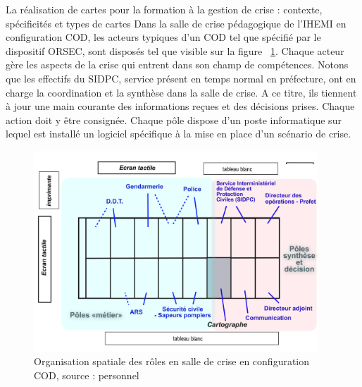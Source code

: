 \documentclass[10pt,a4paper]{report} %
\begin{document}
\begin{part}{La réalisation de cartes pour la formation à la gestion de crise : contexte, spécificités et types de cartes}
Dans la salle de crise pédagogique de l’IHEMI en configuration COD, les acteurs typiques d’un COD tel que spécifié par le dispositif ORSEC, sont disposés tel que visible sur la figure ~\ref{fig7}. Chaque acteur gère les aspects de la crise qui entrent dans son champ de compétences. Notons que les effectifs du SIDPC, service présent en temps normal en préfecture, ont en charge la coordination et la synthèse dans la salle de crise. A ce titre, ils tiennent à jour une main courante des informations reçues et des décisions prises. Chaque action doit y être consignée. Chaque pôle dispose d’un poste informatique sur lequel est installé un logiciel spécifique à la mise en place d’un scénario de crise.
\begin{figure}[!t]
    \centering
    \includegraphics[width=0.95\textwidth]{figures/COD_plan.jpg}
    \caption{Organisation spatiale des rôles en salle de crise en configuration COD, source : personnel}
    \label{fig7}
\end{figure}


\end{part}
\end{document}
